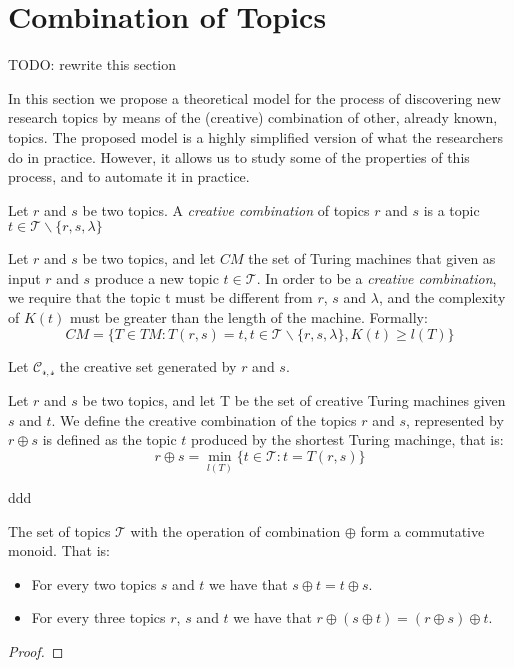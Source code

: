 %
%

\section{Combination of Topics}

{\color{red} TODO: rewrite this section}

In this section we propose a theoretical model for the process of discovering new research topics by means of the (creative) combination of other, already known, topics. The proposed model is a highly simplified version of what the researchers do in practice. However, it allows us to study some of the properties of this process, and to automate it in practice.

\begin{definition}
Let $r$ and $s$ be two topics. A \emph{creative combination} of topics $r$ and $s$ is a topic $t \in \mathcal{T} \backslash \{r, s, \lambda\}$
\end{definition}

Let $r$ and $s$ be two topics, and let $CM$ the set of Turing machines that given as input $r$ and $s$ produce a new topic $t \in \mathcal{T}$. In order to be a \emph{creative combination}, we require that the topic t must be different from $r$, $s$ and $\lambda$, and the complexity of $K(t)$ must be greater than the length of the machine. Formally:
\[
CM = \{ T \in TM : T(r, s) = t, t \in \mathcal{T} \backslash \{r, s, \lambda\}, K(t) \geq l(T) \}
\]

Let $\mathcal{C_{r,s}}$ the creative set generated by $r$ and $s$.


\begin{definition}

\end{definition}



\begin{definition}
Let $r$ and $s$ be two topics, and let T be the set of creative Turing machines given $s$ and $t$. We define the creative combination of the topics $r$ and $s$, represented by $r \oplus s$ is defined as the topic $t$ produced by the shortest Turing machinge, that is:
\[
r \oplus s = \min_{l(T)} \{ t \in \mathcal{T} : t = T(r,s) \}
\]
\end{definition}

ddd

\begin{proposition}
The set of topics $\mathcal{T}$ with the operation of combination $\oplus$ form a commutative monoid. That is:
\begin{itemize}
\item For every two topics $s$ and $t$ we have that $s \oplus t = t \oplus s$.
\item  For every three topics $r$, $s$ and $t$ we have that $r \oplus \left( s \oplus t \right) = \left( r \oplus s \right) \oplus t$.
\end{itemize}
\end{proposition}
\begin{proof}
\end{proof}

